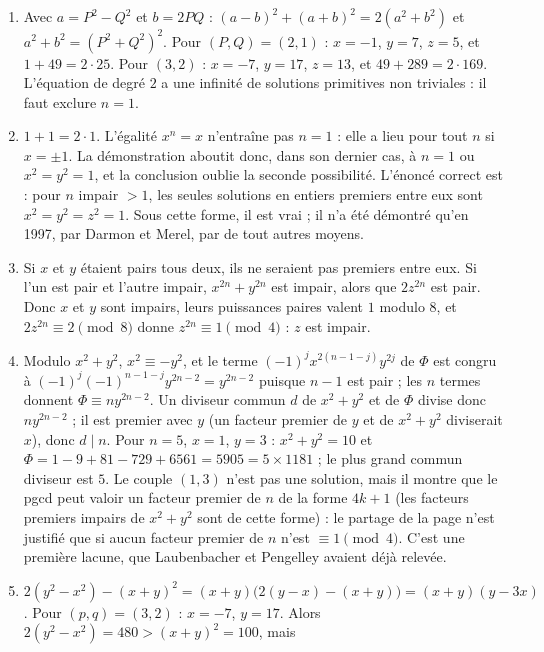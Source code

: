 \documentclass[11pt,a4paper]{article}
\begin{document}
\begin{solution}
\begin{enumerate}
\item Avec $a = P^2 - Q^2$ et $b = 2PQ$ : $(a-b)^2 + (a+b)^2 = 2(a^2 + b^2)$ et
  $a^2 + b^2 = (P^2 + Q^2)^2$. Pour $(P,Q) = (2,1)$ : $x = -1$, $y = 7$, $z = 5$, et
  $1 + 49 = 2\cdot25$. Pour $(3,2)$ : $x = -7$, $y = 17$, $z = 13$, et
  $49 + 289 = 2\cdot169$. L'équation de degré $2$ a une infinité de solutions
  primitives non triviales : il faut exclure $n = 1$.
\item $1 + 1 = 2\cdot1$. L'égalité $x^n = x$ n'entraîne pas $n = 1$ : elle a lieu pour
  tout $n$ si $x = \pm1$. La démonstration aboutit donc, dans son dernier cas, à
  $n = 1$ ou $x^2 = y^2 = 1$, et la conclusion oublie la seconde possibilité. L'énoncé
  correct est : pour $n$ impair $> 1$, les seules solutions en entiers premiers entre
  eux sont $x^2 = y^2 = z^2 = 1$. Sous cette forme, il est vrai ; il n'a été démontré
  qu'en 1997, par Darmon et Merel, par de tout autres moyens.
\item Si $x$ et $y$ étaient pairs tous deux, ils ne seraient pas premiers entre eux.
  Si l'un est pair et
  l'autre impair, $x^{2n} + y^{2n}$ est impair, alors que $2z^{2n}$ est pair. Donc $x$
  et $y$ sont impairs, leurs puissances paires valent $1$ modulo $8$, et
  $2z^{2n} \equiv 2 \pmod 8$ donne $z^{2n} \equiv 1 \pmod 4$ : $z$ est impair.
\item Modulo $x^2 + y^2$, $x^2 \equiv -y^2$, et le terme
  $(-1)^jx^{2(n-1-j)}y^{2j}$ de $\Phi$ est congru à
  $(-1)^j(-1)^{n-1-j}y^{2n-2} = y^{2n-2}$ puisque $n - 1$ est pair ; les $n$ termes
  donnent $\Phi \equiv ny^{2n-2}$. Un diviseur commun $d$ de $x^2+y^2$ et de $\Phi$
  divise donc $ny^{2n-2}$ ; il est premier avec $y$ (un facteur premier de $y$ et de
  $x^2 + y^2$ diviserait $x$), donc $d \mid n$. Pour $n = 5$, $x = 1$, $y = 3$ :
  $x^2 + y^2 = 10$ et $\Phi = 1 - 9 + 81 - 729 + 6561 = 5905 = 5\times1181$ ; le plus
  grand commun diviseur est $5$. Le couple $(1,3)$ n'est pas une solution, mais il
  montre que le pgcd peut valoir un facteur premier de $n$ de la forme $4k+1$ (les
  facteurs premiers impairs de $x^2 + y^2$ sont de cette forme) : le partage de la page
  n'est justifié que si aucun facteur premier de $n$ n'est $\equiv 1 \pmod 4$. C'est
  une première lacune, que Laubenbacher et Pengelley avaient déjà relevée.
\item $2(y^2 - x^2) - (x+y)^2 = (x+y)\bigl(2(y-x) - (x+y)\bigr) = (x+y)(y - 3x)$. Pour
  $(p,q) = (3,2)$ : $x = -7$, $y = 17$. Alors $2(y^2 - x^2) = 480 > (x+y)^2 = 100$, mais

\end{enumerate}
\end{solution}
\end{document}
